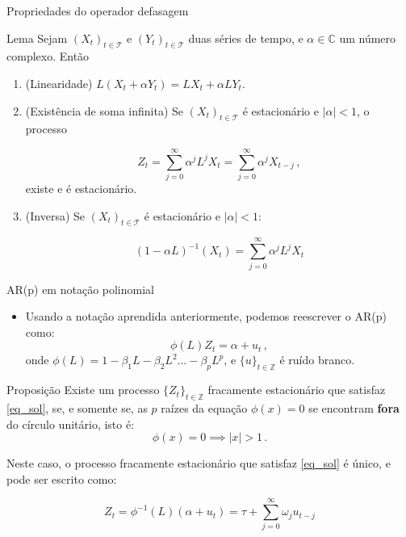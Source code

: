 \documentclass[11pt]{beamer}
\begin{document}
	\begin{frame}{Propriedades do operador defasagem}
		\begin{block}{Lema}
			Sejam $(X_t)_{t \in \mathcal{T}}$ e $(Y_t)_{t \in \mathcal{T}}$ duas séries de tempo, e $\alpha \in \mathbb{C}$ um número complexo. Então
			\begin{enumerate}
				\item (Linearidade) $L(X_t+\alpha Y_t) =LX_t + \alpha LY_t$.
				\item (Existência de soma infinita) Se $(X_t)_{t \in \mathcal{T}}$ é estacionário e  $|\alpha|<1$, o processo
				
				$$Z_t= \sum_{j=0}^{\infty} \alpha^j L^j X_{t} = \sum_{j=0}^{\infty} \alpha^j X_{t-j}\, ,$$
				existe e é estacionário.
				\item (Inversa) Se $(X_t)_{t \in \mathcal{T}}$ é estacionário e  $|\alpha|<1$:
				
				$$(1-\alpha L)^{-1}(X_t) = \sum_{j=0}^{\infty} \alpha^j L^j X_t$$
			\end{enumerate}
		\end{block}
	\end{frame}

	\begin{frame}{AR(p) em notação polinomial}
	\begin{itemize}
	\item Usando a notação aprendida anteriormente, podemos reescrever o AR(p) como:
	\begin{equation}
		\label{eq_sol}
		\phi(L)Z_t = \alpha + u_t \, , 
	\end{equation}
	onde $\phi(L) = 1 - \beta_1L - \beta_2 L^2 \ldots - \beta_p L^p$, e $\{u\}_{t \in \mathbb{Z}}$ é ruído branco.
	\end{itemize}
		
		\begin{block}{Proposição}
			Existe um processo $\{Z_t\}_{t \in \mathbb{Z}}$ fracamente estacionário que satisfaz \eqref{eq_sol}, se, e somente se, as $p$ raízes da equação $\phi(x) = 0$ se encontram \textbf{fora} do círculo unitário, isto é:
			$$\phi(x) = 0 \implies |x| > 1 \, .$$
			
			Neste caso, o processo fracamente estacionário que satisfaz \eqref{eq_sol} é único, e pode ser escrito como:
			
			$$Z_t = \phi^{-1}(L)(\alpha + u_t) =  \tau + \sum_{j=0}^\infty \omega_j u_{t-j}$$
		\end{block}
	\end{frame}
	
\end{document}
